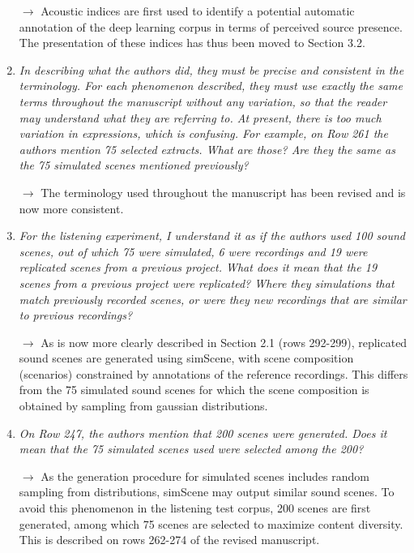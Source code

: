 \documentclass[10pt]{article}
\begin{document}
\begin{enumerate}
$\rightarrow$ Acoustic indices are first used to identify a potential automatic annotation of the deep learning corpus in terms of perceived source presence. The presentation of these indices has thus been moved to Section 3.2.

\item \emph{In describing what the authors did, they must be precise and consistent in the terminology. For each phenomenon described, they must use exactly the same terms throughout the manuscript without any variation, so that the reader may understand what they are referring to. At present, there is too much variation in expressions, which is confusing. For example, on Row 261 the authors mention 75 selected extracts. What are those? Are they the same as the 75 simulated scenes mentioned previously?}

$\rightarrow$ The terminology used throughout the manuscript has been revised and is now more consistent.

\item \emph{For the listening experiment, I understand it as if the authors used 100 sound scenes, out of which 75 were simulated, 6 were recordings and 19 were replicated scenes from a previous project. What does it mean that the 19 scenes from a previous project were replicated? Where they simulations that match previously recorded scenes, or were they new recordings that are similar to previous recordings?}

$\rightarrow$ As is now more clearly described in Section 2.1 (rows 292-299), replicated sound scenes are generated using simScene, with scene composition (scenarios) constrained by annotations of the reference recordings. This differs from the 75 simulated sound scenes for which the scene composition is obtained by sampling from gaussian distributions.

\item \emph{On Row 247, the authors mention that 200 scenes were generated. Does it mean that the 75 simulated scenes used were selected among the 200?}

$\rightarrow$ As the generation procedure for simulated scenes includes random sampling from distributions, simScene may output similar sound scenes. To avoid this phenomenon in the listening test corpus, 200 scenes are first generated, among which 75 scenes are selected to maximize content diversity. This is described on rows 262-274 of the revised manuscript.


\end{enumerate}
\end{document}
